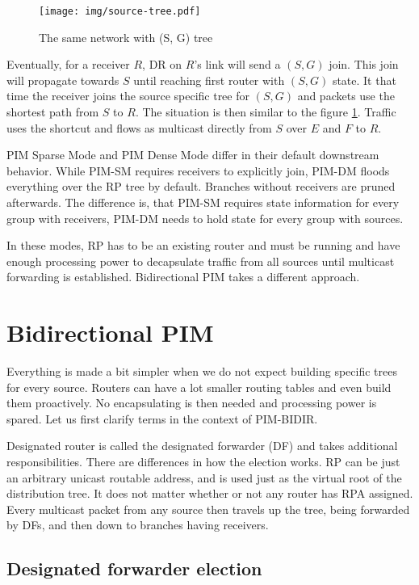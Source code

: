 \begin{figure}[htp]
\centering
\texttt{[image: img/source-tree.pdf]}
\caption{The same network with (S, G) tree}
\label{sg-tree}
\end{figure}

Eventually, for a receiver $R$, DR on $R$'s link will send a $(S, G)$ join.
This join will propagate towards $S$ until reaching first router with $(S,G)$
state. It that time the receiver joins the source specific tree for $(S,G)$ and
packets use the shortest path from $S$ to $R$. The situation is then similar to
the figure \ref{sg-tree}. Traffic uses the shortcut and flows as multicast
directly from $S$ over $E$ and $F$ to $R$.

PIM Sparse Mode and PIM Dense Mode differ in their default downstream behavior.
While PIM-SM requires receivers to explicitly join, PIM-DM floods everything
over the RP tree by default. Branches without receivers are pruned afterwards.
The difference is, that PIM-SM requires state information for every group with
receivers, PIM-DM needs to hold state for every group with sources.

In these modes, RP has to be an existing router and must be running and have
enough processing power to decapsulate traffic from all sources until multicast
forwarding is established. Bidirectional PIM takes a different approach.

\section{Bidirectional PIM}

Everything is made a bit simpler when we do not expect building specific trees
for every source. Routers can have a lot smaller routing tables and even build
them proactively. No encapsulating is then needed and processing power is
spared. Let us first clarify terms in the context of PIM-BIDIR.

Designated router is called the designated forwarder (DF) and takes additional
responsibilities. There are differences in how the election works. RP can be
just an arbitrary unicast routable address, and is used just as the virtual root of the
distribution tree. It does not matter whether or not any router has RPA
assigned. Every multicast packet from any source then travels up the tree,
being forwarded by DFs, and then down to branches having receivers.

\subsection{Designated forwarder election}

